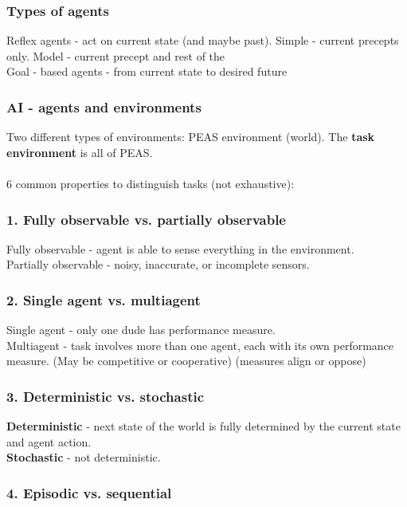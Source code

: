 \documentclass[10pt]{article}
\theoremstyle{plain}
\begin{document}
\subsubsection*{Types of agents}
Reflex agents - act on current state (and maybe past). Simple - current precepts only. Model - current precept and rest of the \\
Goal - based agents - from current state to desired future

\subsubsection*{AI - agents and environments}

Two different types of environments: PEAS environment (world). The \textbf{task environment} is all of PEAS. \\\\
6 common properties to distinguish tasks (not exhaustive): 

\subsubsection*{1. Fully observable vs. partially observable}

Fully observable - agent is able to sense everything in the environment. \\
Partially observable  - noisy, inaccurate, or incomplete sensors. 

\subsubsection*{2. Single agent vs. multiagent}

Single agent - only one dude has performance measure. \\
Multiagent - task involves more than one agent, each with its own performance measure. (May be competitive or cooperative) (measures align or oppose)

\subsubsection*{3. Deterministic vs. stochastic}


\textbf{Deterministic} - next state of the world is fully determined by the current state and agent action. \\
\textbf{Stochastic} - not deterministic. 


\subsubsection*{4. Episodic vs. sequential}
\end{document}
